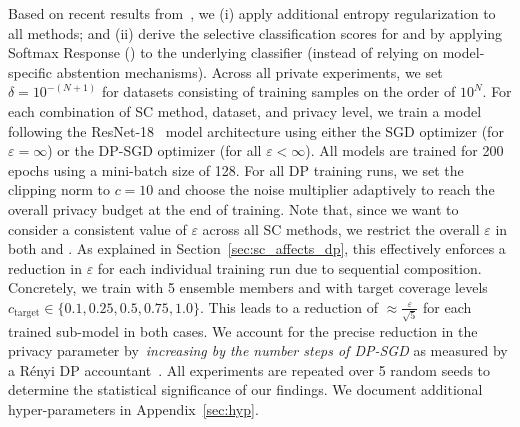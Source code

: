 Based on recent results from~\citet{feng2023towards}, we (i) apply additional entropy regularization to all methods; and (ii) derive the selective classification scores for \sn and \sat by applying Softmax Response (\sr) to the underlying classifier (instead of relying on model-specific abstention mechanisms). Across all private experiments, we set $\delta = 10^{-(N+1)}$ for datasets consisting of training samples on the order of $10^N$. For each combination of SC method, dataset, and privacy level, we train a model following the ResNet-18~\citep{he2016deep} model architecture using either the SGD optimizer (for $\varepsilon=\infty$) or the DP-SGD optimizer (for all $\varepsilon<\infty$). All models are trained for 200 epochs using a mini-batch size of 128. For all DP training runs, we set the clipping norm to $c=10$ and choose the noise multiplier adaptively to reach the overall privacy budget at the end of training. Note that, since we want to consider a consistent value of $\varepsilon$ across all SC methods, we restrict the overall $\varepsilon$ in both \sn and \de. As explained in Section~\ref{sec:sc_affects_dp}, this effectively enforces a reduction in $\varepsilon$ for each individual training run due to sequential composition. Concretely, we train \de with 5 ensemble members and \sn with target coverage levels $c_\text{target} \in \{0.1,0.25,0.5,0.75,1.0\}$. This leads to a reduction of $\approx\frac{\varepsilon}{\sqrt 5}$ for each trained sub-model in both cases. We account for the precise reduction in the privacy parameter by~\emph{increasing by the number steps of DP-SGD} as measured by a R\'enyi DP accountant~\citep{mironov2017renyi,opacus}. %
All experiments are repeated over 5 random seeds to determine the statistical significance of our findings. We document additional %
hyper-parameters in Appendix~\ref{sec:hyp}.

